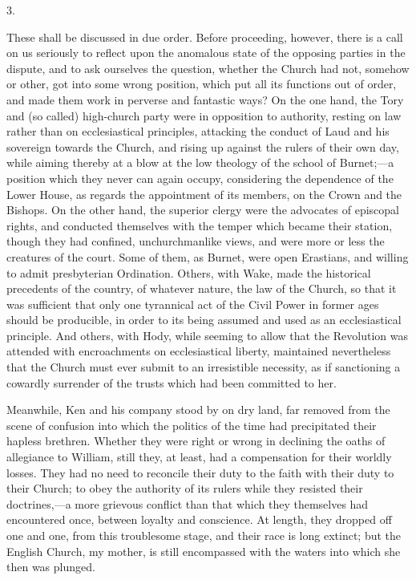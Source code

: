 3.

These shall be discussed in
due order. Before proceeding, however, there is a call on us seriously
to reflect upon the anomalous state of the opposing parties in the
dispute, and to ask ourselves the question, whether the Church had
not, somehow or other, got into some wrong position, which put all its
functions out of order, and made them work in perverse and
fantastic ways? On the one hand, the Tory and (so called) high-church
party were in opposition to authority, resting on law rather than on
ecclesiastical principles, attacking the conduct of Laud and his
sovereign towards the Church, and rising up against the rulers of
their own day, while aiming thereby at a blow at the low theology of
the school of Burnet;—a position which they never can again occupy,
considering the dependence of the Lower House, as regards the
appointment of its members, on the Crown and the Bishops. On the other
hand, the superior clergy were the advocates of episcopal rights, and
conducted themselves with the temper which became their station,
though they had confined, unchurchmanlike views, and were more or less
the creatures of the court. Some of them, as Burnet, were open
Erastians, and willing to admit presbyterian Ordination. Others, with
Wake, made the historical precedents of the country, of whatever
nature, the law of the Church, so that it was sufficient that only one
tyrannical act of the Civil Power in former ages should be producible,
in order to its being assumed and used as an ecclesiastical principle.
And others, with Hody, while seeming to allow that the Revolution was
attended with encroachments on ecclesiastical liberty, maintained
nevertheless that the Church must ever submit to an irresistible
necessity, as if sanctioning a cowardly surrender of the trusts which
had been committed to her.

Meanwhile, Ken and his company
stood by on dry land, far removed from the scene of confusion into
which the politics of the time had precipitated their hapless
brethren. Whether they were right or wrong in declining the oaths of
allegiance to William, still they, at least, had a compensation for
their worldly losses. They had no need to reconcile their duty to the
faith with their duty to their Church; to obey the authority of
its rulers while they resisted their doctrines,—a more grievous
conflict than that which they themselves had encountered once, between
loyalty and conscience. At length, they dropped off one and one, from
this troublesome stage, and their race is long extinct; but the
English Church, my mother, is still encompassed with the waters into
which she then was plunged.


